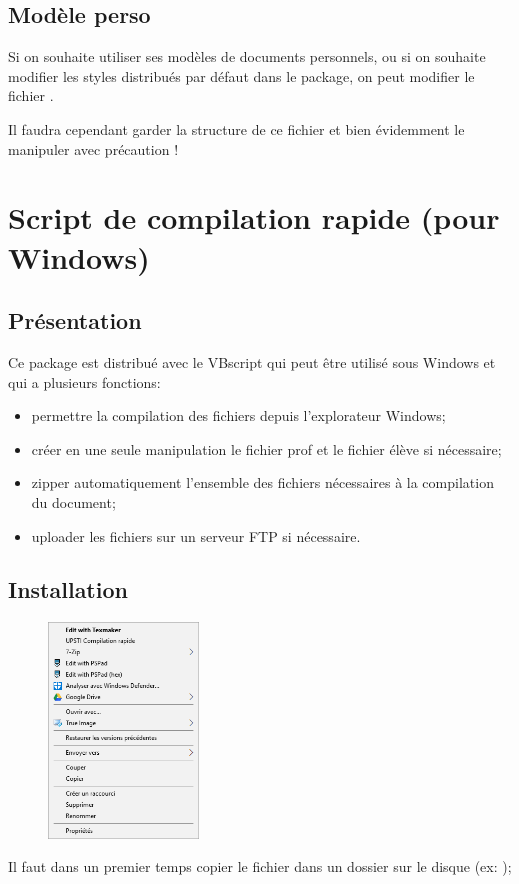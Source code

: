 \documentclass[11pt]{article}
\begin{document}
\subsection{Modèle perso\label{modelePerso}}
Si on souhaite utiliser ses modèles de documents personnels, ou si on souhaite modifier les styles distribués par défaut dans le package, on peut modifier le fichier .

Il faudra cependant garder la structure de ce fichier et bien évidemment le manipuler avec précaution !


\section{Script de compilation rapide (pour Windows)}
\subsection{Présentation}
Ce package est distribué avec le VBscript  qui peut être utilisé sous Windows et qui a plusieurs fonctions:
\begin{itemize}
\item permettre la compilation des fichiers  depuis l'explorateur Windows;
\item créer en une seule manipulation le fichier prof et le fichier élève si nécessaire;
\item zipper automatiquement l'ensemble des fichiers nécessaires à la compilation du document;
\item uploader les fichiers sur un serveur FTP si nécessaire.
\end{itemize}


\subsection{Installation}
\begin{figure}
  \centering
  \vspace{-2em}
  \includegraphics[width=4cm]{Src/Images/menuContextuel.png}
  \vspace{-3em}
\end{figure}
Il faut dans un premier temps copier le fichier  dans un dossier sur le disque (ex: );
\end{document}
